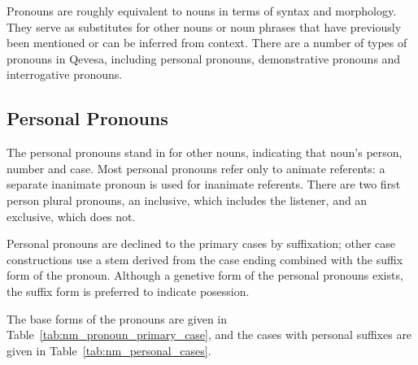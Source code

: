 \documentclass[grammar]{subfiles}
\begin{document}
  Pronouns are roughly equivalent to nouns in terms of syntax and morphology. They serve as substitutes for other nouns or noun phrases that have previously been mentioned or can be inferred from context. There are a number of types of pronouns in Qevesa, including personal pronouns, demonstrative pronouns and interrogative pronouns.


  \subsection{Personal Pronouns}
  \label{ssec:nm_personal_pronouns}

  The personal pronouns stand in for other nouns, indicating that noun's person, number and case. Most personal pronouns refer only to animate referents: a separate inanimate pronoun is used for inanimate referents. There are two first person plural pronouns, an inclusive, which includes the listener, and an exclusive, which does not. 

  Personal pronouns are declined to the primary cases by suffixation; other case constructions use a stem derived from the case ending combined with the suffix form of the pronoun. Although a genetive form of the personal pronouns exists, the suffix form is preferred to indicate posession. 

  The base forms of the pronouns are given in Table~\ref{tab:nm_pronoun_primary_case}, and the cases with personal suffixes are given in Table~\ref{tab:nm_personal_cases}.
\end{document}
